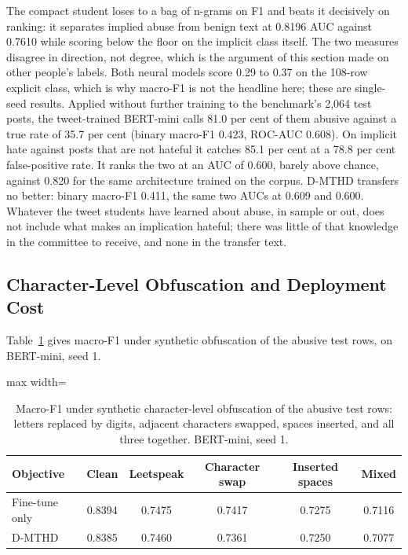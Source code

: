 The compact student loses to a bag of n-grams on F1 and beats it decisively on ranking: it separates
implied abuse from benign text at 0.8196 AUC against 0.7610 while scoring below the floor on the
implicit class itself. The two measures disagree in direction, not degree, which is the argument of
this section made on other people's labels. Both neural models score 0.29 to 0.37 on the 108-row
explicit class, which is why macro-F1 is not the headline here; these are single-seed results.
Applied without further training to the benchmark's 2,064 test posts, the tweet-trained BERT-mini
calls 81.0 per cent of them abusive against a true rate of 35.7 per cent (binary macro-F1 0.423,
ROC-AUC 0.608). On implicit hate against posts that are not hateful it catches 85.1 per cent at a
78.8 per cent false-positive rate. It ranks the two at an AUC of 0.600, barely above chance, against
0.820 for the same architecture trained on the corpus. D-MTHD transfers no better: binary macro-F1
0.411, the same two AUCs at 0.609 and 0.600. Whatever the tweet students have learned about abuse,
in sample or out, does not include what makes an implication hateful; there was little of that
knowledge in the committee to receive, and none in the transfer text.
\subsection{Character-Level Obfuscation and Deployment Cost}
\label{sec:5.11}
Table~\ref{tab:robustness} gives macro-F1 under synthetic obfuscation of the abusive test rows, on
BERT-mini, seed 1.

\begin{table}[htbp]
\centering
\small
\caption[Macro-F1 under character-level obfuscation]{Macro-F1 under synthetic character-level obfuscation of the abusive test rows: letters replaced by digits, adjacent characters swapped, spaces inserted, and all three together. BERT-mini, seed 1.}
\label{tab:robustness}
\begin{adjustbox}{max width=\textwidth}
\begin{tabular}{lccccc}
\toprule
Objective & Clean & Leetspeak & Character swap & Inserted spaces & Mixed \\
\midrule
Fine-tune only & 0.8394 & 0.7475 & 0.7417 & 0.7275 & 0.7116 \\
D-MTHD & 0.8385 & 0.7460 & 0.7361 & 0.7250 & 0.7077 \\
\bottomrule
\end{tabular}
\end{adjustbox}
\end{table}

